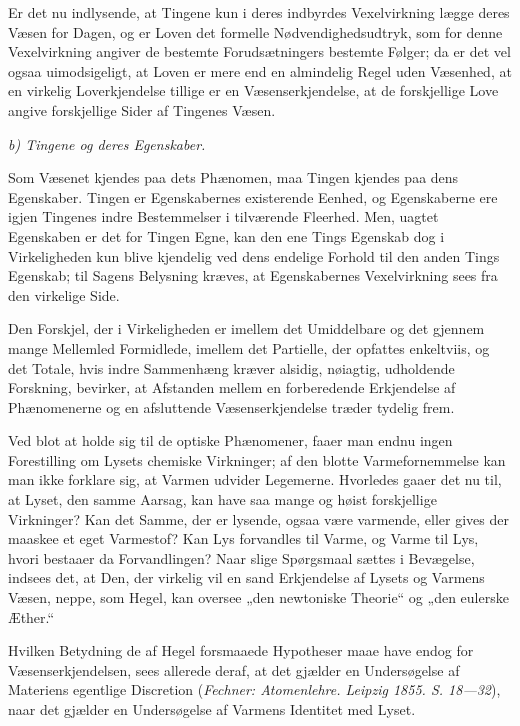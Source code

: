\documentclass[12pt]{book}
\newcommand{\opage}[1]{\marginnote{\footnotesize\textit{[#1]}}}
\begin{document}
Er det nu indlysende, at Tingene kun i deres indbyrdes Vexelvirkning lægge deres Væsen
for Dagen, og er Loven det formelle Nødvendighedsudtryk, som for denne Vexelvirkning
angiver de bestemte Forudsætningers bestemte Følger; da er det vel ogsaa uimodsigeligt,
at Loven er mere end en almindelig Regel uden Væsenhed, at en virkelig Loverkjendelse
tillige er en Væsenserkjendelse, at de forskjellige Love angive forskjellige Sider af
Tingenes Væsen.

\emph{b) Tingene og deres Egenskaber.}

Som Væsenet kjendes paa dets Phænomen, maa Tingen kjendes paa dens Egenskaber. Tingen
er Egenskabernes existerende Eenhed, og Egenskaberne ere igjen Tingenes indre
Bestemmelser i tilværende Fleerhed. Men, uagtet Egenskaben er det for Tingen Egne, kan
den ene Tings Egenskab dog i Virkeligheden kun blive kjendelig ved dens endelige
Forhold til den anden Tings Egenskab; til Sagens Belysning kræves, at Egenskabernes
Vexelvirkning sees fra den virkelige Side.

Den Forskjel, der i Virkeligheden er imellem det Umiddelbare og det gjennem mange
Mellemled Formidlede, imellem det Partielle, der opfattes enkeltviis, og det Totale,
hvis indre Sammenhæng kræver alsidig, nøiagtig, udholdende Forskning, bevirker, at
Afstanden mellem en forberedende
\opage{64} Erkjendelse af Phænomenerne og en afsluttende Væsenserkjendelse træder tydelig frem.

Ved blot at holde sig til de optiske Phænomener, faaer man endnu ingen Forestilling om
Lysets chemiske Virkninger; af den blotte Varmefornemmelse kan man ikke forklare sig,
at Varmen udvider Legemerne. Hvorledes gaaer det nu til, at Lyset, den samme Aarsag,
kan have saa mange og høist forskjellige Virkninger? Kan det Samme, der er lysende,
ogsaa være varmende, eller gives der maaskee et eget Varmestof? Kan Lys forvandles til
Varme, og Varme til Lys, hvori bestaaer da Forvandlingen? Naar slige Spørgsmaal sættes
i Bevægelse, indsees det, at Den, der virkelig vil en sand Erkjendelse af Lysets og
Varmens Væsen, neppe, som Hegel, kan oversee „den newtoniske Theorie“ og „den eulerske
Æther.“

Hvilken Betydning de af Hegel forsmaaede Hypotheser maae have endog for
Væsenserkjendelsen, sees allerede deraf, at det gjælder en Undersøgelse af Materiens
egentlige Discretion (\textit{Fechner: Atomenlehre. Leipzig 1855. S. 18—32}), naar det
gjælder en Undersøgelse af Varmens Identitet med Lyset.
\end{document}
